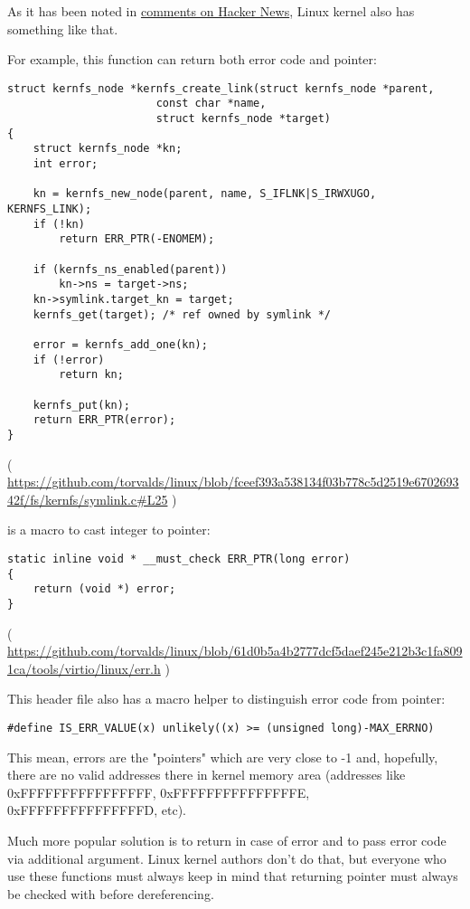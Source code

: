 As it has been noted in \href{https://news.ycombinator.com/item?id=11823647}{comments on Hacker News}, Linux kernel also has something like that.

For example, this function can return both error code and pointer:

\begin{lstlisting}
struct kernfs_node *kernfs_create_link(struct kernfs_node *parent,
				       const char *name,
				       struct kernfs_node *target)
{
	struct kernfs_node *kn;
	int error;

	kn = kernfs_new_node(parent, name, S_IFLNK|S_IRWXUGO, KERNFS_LINK);
	if (!kn)
		return ERR_PTR(-ENOMEM);

	if (kernfs_ns_enabled(parent))
		kn->ns = target->ns;
	kn->symlink.target_kn = target;
	kernfs_get(target);	/* ref owned by symlink */

	error = kernfs_add_one(kn);
	if (!error)
		return kn;

	kernfs_put(kn);
	return ERR_PTR(error);
}
\end{lstlisting}

( \url{https://github.com/torvalds/linux/blob/fceef393a538134f03b778c5d2519e670269342f/fs/kernfs/symlink.c#L25} )

 is a macro to cast integer to pointer:

\begin{lstlisting}
static inline void * __must_check ERR_PTR(long error)
{
	return (void *) error;
}
\end{lstlisting}

( \url{https://github.com/torvalds/linux/blob/61d0b5a4b2777dcf5daef245e212b3c1fa8091ca/tools/virtio/linux/err.h} )

This header file also has a macro helper to distinguish error code from pointer:

\begin{lstlisting}
#define IS_ERR_VALUE(x) unlikely((x) >= (unsigned long)-MAX_ERRNO)
\end{lstlisting}

This mean, errors are the "pointers" which are very close to -1 and, hopefully, there are no valid addresses there in kernel memory area
(addresses like 0xFFFFFFFFFFFFFFFF, 0xFFFFFFFFFFFFFFFE,\\
0xFFFFFFFFFFFFFFFD, etc).

Much more popular solution is to return  in case of error and to pass error code via additional argument.
Linux kernel authors don't do that, but everyone who use these functions must always keep in mind that returning pointer
must always be checked with  before dereferencing.

